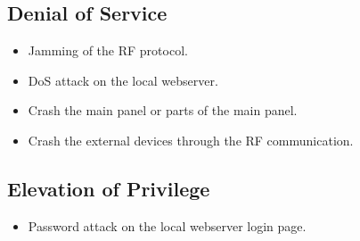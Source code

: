\subsection{Denial of Service}
\begin{itemize}
    \item Jamming of the RF protocol.
    \item DoS attack on the local webserver.
    \item Crash the main panel or parts of the main panel.
    \item Crash the external devices through the RF communication.
\end{itemize}

\subsection{Elevation of Privilege}
\begin{itemize}
    \item Password attack on the local webserver login page.
\end{itemize}

